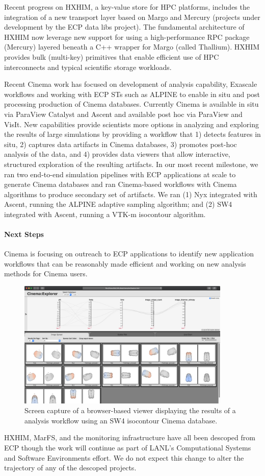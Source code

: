 Recent progress on HXHIM, a key-value store for HPC platforms, includes the
integration of a new transport layer based on Margo and Mercury (projects
under development by the ECP data libs project). The fundamental architecture
of HXHIM now leverage new support for using a high-performance RPC package
(Mercury) layered beneath a C++ wrapper for Margo (called Thallium). HXHIM
provides bulk (multi-key) primitives that enable efficient use of HPC
interconnects and typical scientific storage workloads.


Recent Cinema work has focused on development of analysis capability, Exascale workflows and working with ECP STs such as ALPINE to enable in situ and post processing production of Cinema databases.  Currently Cinema is available in situ via ParaView Catalyst and Ascent and available post hoc via ParaView and VisIt.   New capabilities provide scientists more options in analyzing and exploring the results of large simulations by providing a workflow that 1) detects features in situ, 2) captures data artifacts in Cinema databases, 3) promotes post-hoc analysis of the data, and 4) provides data viewers that allow interactive, structured exploration of the resulting artifacts. 
%
In our most recent milestone, we ran two end-to-end simulation pipelines with ECP applications at scale to generate Cinema databases and ran Cinema-based workflows with Cinema algorithms to produce secondary set of artifacts.  We ran (1) Nyx integrated with Ascent, running the ALPINE adaptive sampling algorithm; and (2) SW4 integrated with Ascent, running a VTK-m isocontour algorithm.  

\paragraph{Next Steps}
Cinema is focusing on outreach to ECP applications to identify new application workflows that can be reasonably made efficient and working on new analysis methods for Cinema users.

\begin{figure}[htb]
	\centering
	\includegraphics[width=4in]{projects/2.3.6-NNSA/2.3.6.01-LANL-ATDM/cinema-sw4-example.png}
	\caption{
		Screen capture of a browser-based viewer displaying the results of a analysis workflow using an SW4 isocontour Cinema database.  
	\label{fig:cinema-sw4example}
	}
\end{figure}

HXHIM, MarFS, and the monitoring infrastructure have all been descoped
from ECP though the work will continue as part of LANL's Computational Systems
and Software Environments effort. We do not expect this change to alter the
trajectory of any of the descoped projects.
